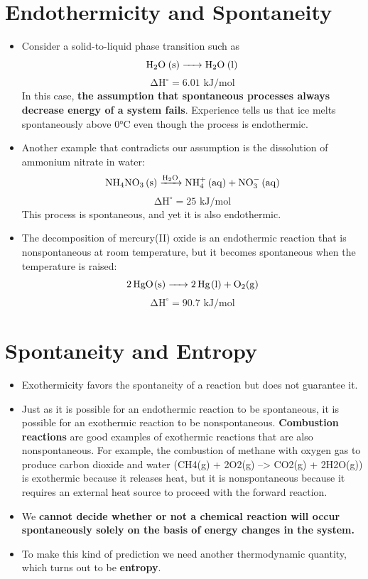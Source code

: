 \documentclass[a4paper,12pt,twocolumn]{article}
\begin{document}
\section{Endothermicity and Spontaneity}
\begin{itemize}
    \item Consider a solid-to-liquid phase transition such as
$$\ce{H2O (s) -> H2O (l)}$$
$$\mathrm{\Delta H^{\circ} = 6.01 \text{ kJ/mol}}$$
    In this case, \textbf{the assumption that spontaneous processes always decrease energy of a system fails}. Experience tells us that ice melts spontaneously above 0°C even though the process is endothermic.
\item Another example that contradicts our assumption is the dissolution of ammonium nitrate in water:
$$\ce{NH4NO3 (s) ->[H2O] NH^{+}4 (aq) + NO^{-}3 (aq)}$$
$$\mathrm{\Delta H^{\circ} = 25 \text{ kJ/mol}}$$
This process is spontaneous, and yet it is also endothermic.
\item   The decomposition of mercury(II) oxide is an endothermic reaction that is nonspontaneous at room temperature, but it becomes spontaneous when the temperature is raised:
$$\ce{2HgO(s) -> 2Hg(l) + O2(g)}$$
$$\mathrm{\Delta H^{\circ} = 90.7 \text{ kJ/mol}}$$
\end{itemize}

\section{Spontaneity and Entropy}
\begin{itemize}
\item Exothermicity favors the spontaneity of a reaction but does not guarantee it. 
\item Just as it is possible for an endothermic reaction to be spontaneous, it is possible for an exothermic reaction to be nonspontaneous. \textbf{Combustion reactions} are good examples of exothermic reactions that are also nonspontaneous. For example, the combustion of methane with oxygen gas to produce carbon dioxide and water (CH4(g) + 2O2(g) --> CO2(g) + 2H2O(g)) is exothermic because it releases heat, but it is nonspontaneous because it requires an external heat source to proceed with the forward reaction.
\item We \textbf{cannot decide whether or not a chemical reaction will occur spontaneously solely on the basis of energy changes in the system.} 
\item To make this kind of prediction we need another thermodynamic quantity, which turns out to be \textbf{entropy}.
\end{itemize}
\end{document}
